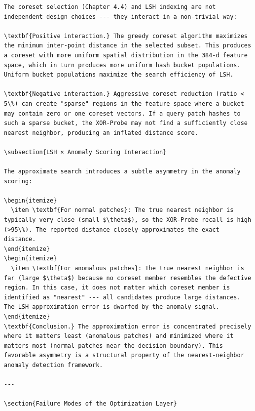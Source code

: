 \documentclass[12pt,a4paper,oneside]{report}
\begin{document}
\begin{verbatim}
The coreset selection (Chapter 4.4) and LSH indexing are not independent design choices --- they interact in a non-trivial way:

\textbf{Positive interaction.} The greedy coreset algorithm maximizes the minimum inter-point distance in the selected subset. This produces a coreset with more uniform spatial distribution in the 384-d feature space, which in turn produces more uniform hash bucket populations. Uniform bucket populations maximize the search efficiency of LSH.

\textbf{Negative interaction.} Aggressive coreset reduction (ratio < 5\%) can create "sparse" regions in the feature space where a bucket may contain zero or one coreset vectors. If a query patch hashes to such a sparse bucket, the XOR-Probe may not find a sufficiently close nearest neighbor, producing an inflated distance score.

\subsection{LSH × Anomaly Scoring Interaction}

The approximate search introduces a subtle asymmetry in the anomaly scoring:

\begin{itemize}
  \item \textbf{For normal patches}: The true nearest neighbor is typically very close (small $\theta$), so the XOR-Probe recall is high (>95\%). The reported distance closely approximates the exact distance.
\end{itemize}
\begin{itemize}
  \item \textbf{For anomalous patches}: The true nearest neighbor is far (large $\theta$) because no coreset member resembles the defective region. In this case, it does not matter which coreset member is identified as "nearest" --- all candidates produce large distances. The LSH approximation error is dwarfed by the anomaly signal.
\end{itemize}
\textbf{Conclusion.} The approximation error is concentrated precisely where it matters least (anomalous patches) and minimized where it matters most (normal patches near the decision boundary). This favorable asymmetry is a structural property of the nearest-neighbor anomaly detection framework.

---

\section{Failure Modes of the Optimization Layer}


\end{verbatim}
\end{document}
